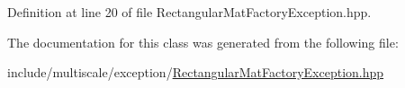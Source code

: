 Definition at line 20 of file Rectangular\-Mat\-Factory\-Exception.\-hpp.



The documentation for this class was generated from the following file\-:\begin{DoxyCompactItemize}
\item 
include/multiscale/exception/\hyperlink{RectangularMatFactoryException_8hpp}{Rectangular\-Mat\-Factory\-Exception.\-hpp}\end{DoxyCompactItemize}
